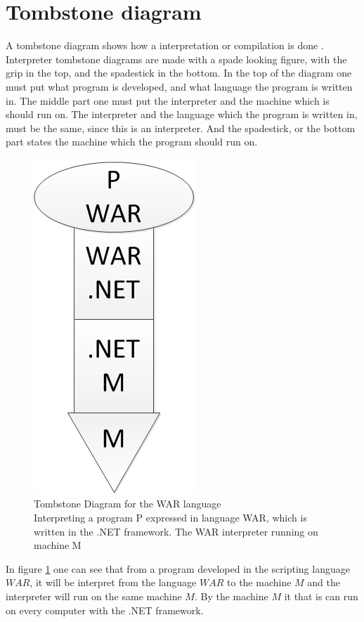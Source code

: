 \section{Tombstone diagram}

A tombstone diagram shows how a interpretation or compilation is done \cite{Tombstone}.
Interpreter tombstone diagrams are made with a spade looking figure, with the grip in the top, and the spadestick in the bottom. In the top of the diagram one must put what program is developed, and what language the program is written in. The middle part one must put the interpreter and the machine which is should run on. The interpreter and the language which the program is written in, must be the same, since this is an interpreter. And the spadestick, or the bottom part states the machine which the program should run on.

			\begin{figure}
				\centering
				\includegraphics[scale=0.75]{rapport/3/figures/tombstone}
				\caption{Tombstone Diagram for the WAR language\\ Interpreting a program P expressed in language WAR, which is written in the .NET framework. The WAR interpreter running on machine M} \label{fig:tombstone}
			\end{figure}
			
In figure \ref{fig:tombstone} one can see that from a program developed in the scripting language $WAR$, it will be interpret from the language $WAR$ to the machine $M$ and the interpreter will run on the same machine $M$. By the machine $M$ it that is can run on every computer with the .NET framework.

